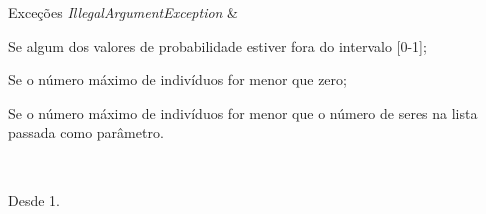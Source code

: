 \begin{DoxyExceptions}{Exceções}
{\em Illegal\-Argument\-Exception} & 
\begin{DoxyItemize}
\item Se algum dos valores de probabilidade estiver fora do intervalo \mbox{[}0-\/1\mbox{]}; 
\item Se o número máximo de indivíduos for menor que zero; 
\item Se o número máximo de indivíduos for menor que o número de {\ttfamily seres} na lista passada como parâmetro. 
\end{DoxyItemize}\\
\hline
\end{DoxyExceptions}
\begin{DoxySince}{Desde}
1. 
\end{DoxySince}


